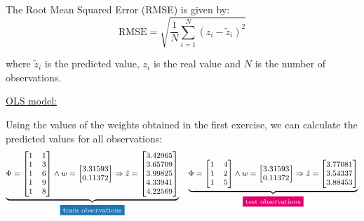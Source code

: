 \documentclass[12pt]{article}
\begin{document}
\begin{enumerate}
    \vspace{10pt}
    The Root Mean Squared Error (RMSE) is given by:
    \begin{equation*}
        \text{RMSE} = \sqrt{\frac{1}{N} \sum_{i=1}^{N} (z_{i} - \tilde{z}_{i})^2}
    \end{equation*}

    where $\tilde{z}_{i}$ is the predicted value, $z_{i}$ is the real value and $N$ is the number of observations.

    \vspace{10pt}
    \underline{OLS model:}

    \vspace{10pt}
    Using the values of the weights obtained in the first exercise, we can calculate the predicted values for all observations:
    \begin{equation*}
        \footnotesize
        \underbrace{
        \Phi = \begin{bmatrix}
            1 & 1 \\
            1 & 3 \\
            1 & 6 \\
            1 & 9 \\
            1 & 8 
        \end{bmatrix} \land w = \begin{bmatrix}
            3.31593 \\
            0.11372
        \end{bmatrix} \Rightarrow \tilde{z} = \begin{bmatrix}
            3.42965 \\
            3.65709 \\
            3.99825 \\
            4.33941 \\
            4.22569
        \end{bmatrix} }_{\text{\colorbox{codeblue}{\textcolor{white}{train observations}}}}
        \quad \underbrace{
            \Phi = \begin{bmatrix}
            1 & 4 \\
            1 & 2 \\
            1 & 5 
        \end{bmatrix} \land w = \begin{bmatrix}
            3.31593 \\
            0.11372
        \end{bmatrix} \Rightarrow \tilde{z} = \begin{bmatrix}
            3.77081 \\
            3.54337 \\
            3.88453
        \end{bmatrix}
        }_{\text{\colorbox{codepink}{\textcolor{white}{test observations}}}}
    \end{equation*}


\end{enumerate}
\end{document}
